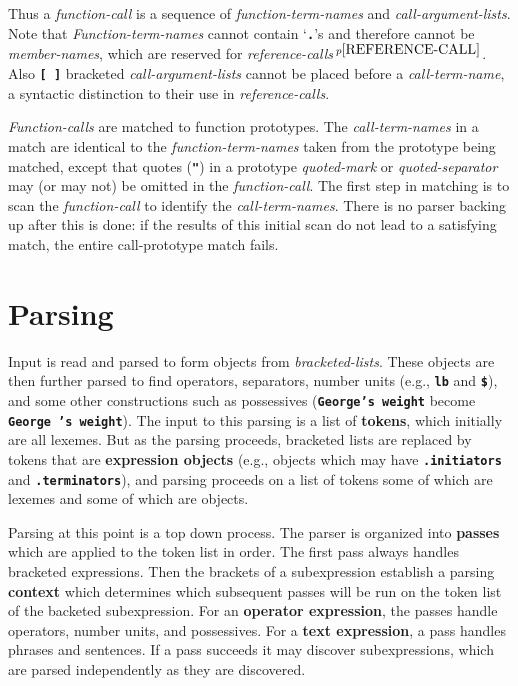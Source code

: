 \documentclass[12pt]{article}
\newcommand{\TT}[1]{{\tt \bfseries #1}}
\newcommand{\key}[1]{{\rm \bfseries #1}}
\newcommand{\pagnote}[1]{$\,^{p\pageref{#1}}$}
\begin{document}
Thus a {\em function-call} is a sequence of {\em function-term-names}
and {\em call-argument-lists}.  Note that {\em Function-term-names} cannot
contain `\TT{.}'s and therefore cannot be {\em member-names},
which are reserved for {\em reference-calls}\pagnote{REFERENCE-CALL}.
Also \TT{[~]} bracketed {\em call-argument-lists} cannot be placed
before a {\em call-term-name}, a syntactic distinction to their
use in {\em reference-calls}.

{\em Function-calls} are matched to function prototypes.  The
{\em call-term-names} in a match are identical to the
{\em function-term-names} taken from the prototype being matched, except
that quotes (\TT{"}) in a prototype {\em quoted-mark} or
{\em quoted-separator} may (or may not) be omitted in the
{\em function-call}.  The first
step in matching is to scan the {\em function-call} to identify the
{\em call-term-names}.  There is no parser backing up after this is
done: if the results of this initial scan do not lead to a satisfying
match, the entire call-prototype match fails.

\section{Parsing}
\label{PARSING}

Input is read and parsed to form objects from {\em bracketed-lists}.
These objects are then further parsed to find operators, separators,
number units (e.g., \TT{lb} and \TT{\$}), and some other constructions
such as possessives (\TT{George's weight} become \TT{George 's weight}).
The input to this parsing is a list of \key{tokens}, which initially are
all lexemes.  But as the parsing proceeds, bracketed lists are replaced
by tokens that are \key{expression objects} (e.g., objects which may have
\TT{.initiators} and \TT{.terminators}), and parsing proceeds on 
a list of tokens some of which are lexemes and some of which are objects.

Parsing at this point is a top down process.  The parser is organized
into \key{passes} which are applied to the token list in order.
The first pass always handles bracketed expressions.
Then the brackets of a subexpression establish a parsing
\key{context} which determines
which subsequent passes will be run on the token list of the backeted
subexpression.  For an \key{operator expression}, the passes
handle operators, number units, and possessives.  For a
\key{text expression}, a pass handles phrases and sentences.
If a pass succeeds it may discover subexpressions, which are
parsed independently as they are discovered.
\end{document}

